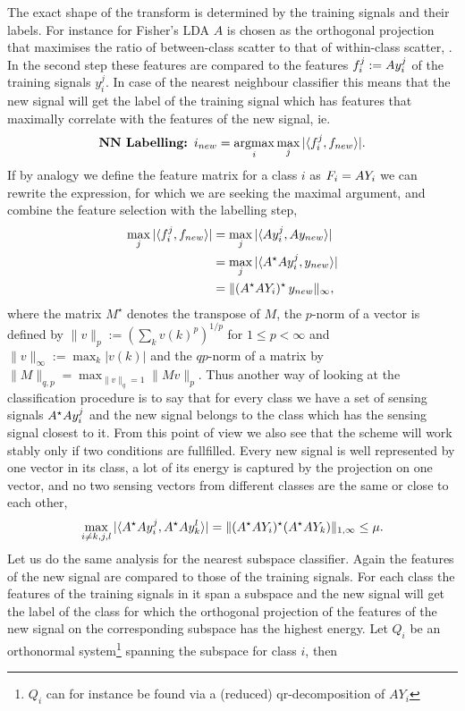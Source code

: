 \documentclass[11pt]{article}
\begin{document}
The exact shape of the transform is determined by the training signals and their labels. For instance for Fisher's LDA $A$ is chosen as the orthogonal projection that maximises the ratio of between-class scatter to that of within-class scatter, \cite{lda}.\\
In the second step these features are compared to the features ${f}_i^j: =A {y}_i^j$ of the training signals $y_i^j$. In case of the nearest neighbour classifier this means that the new signal will get the label of the training signal which has features that maximally correlate with the features of the new signal, ie.
\begin{align}
\mbox{\bf NN Labelling: } i_{new}=\operatorname*{argmax}_i \max_j |\langle {f}_i^j, {{f}_{new}}\rangle|.
\end{align}
If by analogy we define the feature matrix for a class $i$ as ${F}_i=A Y_i$ we can rewrite the expression, for which we are seeking the maximal argument, and combine the feature selection with the labelling step,
\begin{align}
\max_j |\langle {f}_i^j, {{f}_{new}}\rangle|&=\max_j |\langle A{y}_i^j, A {{y}_{new}}\rangle|\notag \\
&= \max_j |\langle A^\star A{y}_i^j, {{y}_{new}}\rangle| \notag \\
&= \| (A^\star A{Y}_i)^\star\, {{y}_{new}}\|_\infty,
\end{align}
where the matrix $M^\star$ denotes the transpose of $M$, the $p$-norm of a vector is defined by $\|v\|_p:=(\sum_k v(k)^p)^{1/p}$ for $1\leq p < \infty$ and $\|v\|_\infty:=\max_k |v(k)|$ and the $qp$-norm of a matrix by $\|M\|_{q,p}=\max_{\|v\|_q=1} \|Mv\|_p$. Thus another way of looking at the classification procedure is to say that for every class we have a set of sensing signals $A^\star A{y}_i^j$ and the new signal belongs to the class which has the sensing signal closest to it. From this point of view we also see that the scheme will work stably only if two conditions are fullfilled. Every new signal is well represented by one vector in its class, \ie a lot of its energy is captured by the projection on one vector, and no two sensing vectors from different classes are the same or close to each other, \ie
\begin{align}
\max_{i\neq k, j,l} |\langle A^\star A{y}_i^j, A^\star A{y}_k^l\rangle| = \|(A^\star A{Y}_i)^\star (A^\star A{Y}_k)\|_{1,\infty}\leq \mu .
\end{align}
Let us do the same analysis for the nearest subspace classifier. Again the features of the new signal are compared to those of the training signals. For each class the features of the training signals in it span a subspace and the new signal will get the label of the class for which the orthogonal projection of the features of the new signal on the corresponding subspace has the highest energy. Let $Q_i$ be an orthonormal system\footnote{$Q_i$ can for instance be found via a (reduced) qr-decomposition of $AY_i$} spanning the subspace for class $i$, then \ie
\end{document}
